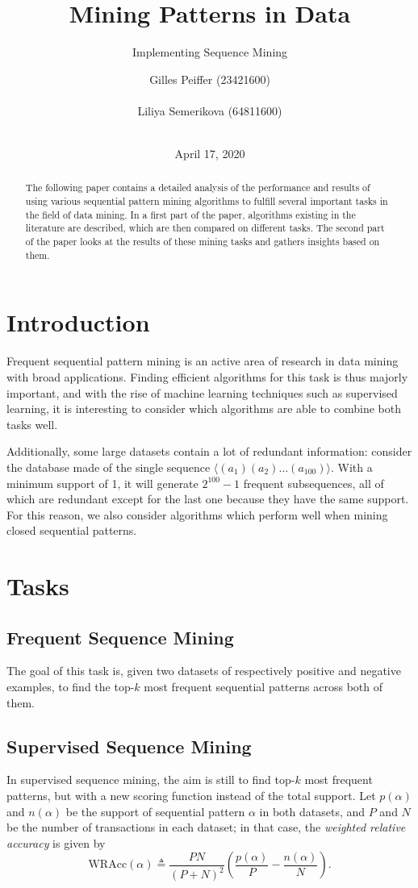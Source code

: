 \documentclass{sigkddExp}
\title{Mining Patterns in Data}
\subtitle{Implementing Sequence Mining}
\author{
\alignauthor Gilles Peiffer (23421600)\\
	\affaddr{Université catholique de Louvain}\\
	\email{gilles.peiffer@student.uclouvain.be}
\alignauthor Liliya Semerikova (64811600)\\
	\affaddr{Université catholique de Louvain}\\
	\email{liliya.semerikova@student.uclouvain.be}}
\date{April 17, 2020}
\newcommand{\wracc}{\mathrm{WRAcc}}
\begin{document}
\maketitle

\begin{abstract}
	The following paper contains a detailed analysis of the performance and results of using various sequential pattern mining algorithms to fulfill several important tasks in the field of data mining.
	In a first part of the paper, algorithms existing in the literature are described, which are then compared on different tasks.
	The second part of the paper looks at the results of these mining tasks and gathers insights based on them.
\end{abstract}

\section{Introduction}
Frequent sequential pattern mining is an active area of research in data mining with broad applications.
Finding efficient algorithms for this task is thus majorly important, and with the rise of machine learning techniques such as supervised learning, it is interesting to consider which algorithms are able to combine both tasks well.

Additionally, some large datasets contain a lot of redundant information: consider the database made of the single sequence \(\langle (a_1)(a_2) \dots (a_{100}) \rangle\).
With a minimum support of 1, it will generate \(2^{100} - 1\) frequent subsequences, all of which are redundant except for the last one because they have the same support.
For this reason, we also consider algorithms which perform well when mining closed sequential patterns.

\section{Tasks}
\label{sec:tasks}
\subsection{Frequent Sequence Mining}
\label{sec:fsm}
The goal of this task is, given two datasets of respectively positive and negative examples, to find the top-\(k\) most frequent sequential patterns across both of them.

\subsection{Supervised Sequence Mining}
\label{sec:ssm}
In supervised sequence mining, the aim is still to find top-\(k\) most frequent patterns, but with a new scoring function instead of the total support.
Let \(p(\alpha)\) and \(n(\alpha)\) be the support of sequential pattern \(\alpha\) in both datasets, and \(P\) and \(N\) be the number of transactions in each dataset; in that case, the \emph{weighted relative accuracy} is given by
\begin{equation}
\wracc(\alpha) \triangleq \frac{PN}{(P + N)^2} \left(\frac{p(\alpha)}{P} - \frac{n(\alpha)}{N}\right).
\end{equation}
\end{document}
